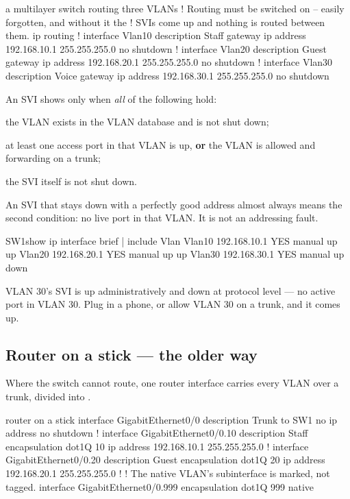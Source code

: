 \begin{config}{a multilayer switch routing three VLANs}
! Routing must be switched on -- easily forgotten, and without it the
! SVIs come up and nothing is routed between them.
ip routing
!
interface Vlan10
 description Staff gateway
 ip address 192.168.10.1 255.255.255.0
 no shutdown
!
interface Vlan20
 description Guest gateway
 ip address 192.168.20.1 255.255.255.0
 no shutdown
!
interface Vlan30
 description Voice gateway
 ip address 192.168.30.1 255.255.255.0
 no shutdown
\end{config}

\begin{alertbox}
An SVI shows  only when \emph{all} of the following hold:
\begin{tight}
  \item the VLAN exists in the VLAN database and is not shut down;
  \item at least one access port in that VLAN is up, \textbf{or} the VLAN is
        allowed and forwarding on a trunk;
  \item the SVI itself is not shut down.
\end{tight}
An SVI that stays down with a perfectly good address almost always means the
second condition: no live port in that VLAN. It is not an addressing fault.
\end{alertbox}

\begin{verify}{SW1}{show ip interface brief | include Vlan}
Vlan10                 192.168.10.1    YES manual up                    up
Vlan20                 192.168.20.1    YES manual up                    up
Vlan30                 192.168.30.1    YES manual up                    down
\end{verify}

VLAN 30's SVI is up administratively and down at protocol level --- no active
port in VLAN 30. Plug in a phone, or allow VLAN 30 on a trunk, and it comes up.

\subsection{Router on a stick --- the older way}

Where the switch cannot route, one router interface carries every VLAN over a
trunk, divided into .

\begin{config}{router on a stick}
interface GigabitEthernet0/0
 description Trunk to SW1
 no ip address
 no shutdown
!
interface GigabitEthernet0/0.10
 description Staff
 encapsulation dot1Q 10
 ip address 192.168.10.1 255.255.255.0
!
interface GigabitEthernet0/0.20
 description Guest
 encapsulation dot1Q 20
 ip address 192.168.20.1 255.255.255.0
!
! The native VLAN's subinterface is marked, not tagged.
interface GigabitEthernet0/0.999
 encapsulation dot1Q 999 native
\end{config}

